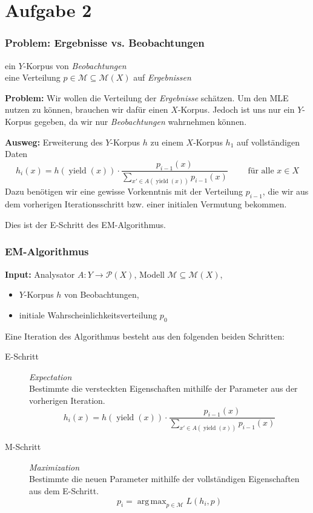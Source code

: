 \documentclass{beamer}
\DeclareMathOperator*{\argmax}{arg\,max}
\begin{document}
\section{Aufgabe 2}

\begin{frame} \frametitle{Problem: Ergebnisse vs. Beobachtungen}
	\justifying \footnotesize 
	 ein $Y$-Korpus von \textit{Beobachtungen} \\	
	 eine Verteilung $p \in \mathcal{M} \subseteq \mathcal{M}(X)$ auf \textit{Ergebnissen}
	
	\bigskip \pause
	
	\textbf{Problem:} Wir wollen die Verteilung der \textit{Ergebnisse} schätzen. Um den MLE nutzen zu können, brauchen wir dafür einen $X$-Korpus. Jedoch ist uns nur ein $Y$-Korpus gegeben, da wir nur \textit{Beobachtungen} wahrnehmen können. 
	\pause
	
	\textbf{Ausweg:} Erweiterung des $Y$-Korpus $h$ zu einem $X$-Korpus $h_1$ auf vollständigen Daten
	\begin{equation*}
		h_i(x) = h(\operatorname{yield}(x)) \cdot \frac{p_{i-1}(x)}{\sum_{x' \in A(\operatorname{yield}(x))} p_{i-1}(x)} \qquad \text{ für alle } x \in X
	\end{equation*}
	Dazu benötigen wir eine gewisse Vorkenntnis mit der Verteilung $p_{i-1}$, die wir aus dem vorherigen Iterationsschritt bzw. einer initialen Vermutung bekommen.
	
	Dies ist der E-Schritt des EM-Algorithmus.
\end{frame}

\begin{frame} \frametitle{EM-Algorithmus}
	\footnotesize
	\textbf{Input:} Analysator $A : Y \to \mathcal{P}(X)$, Modell $\mathcal{M} \subseteq \mathcal{M}(X)$, \\
	\begin{itemize}
		\item $Y$-Korpus $h$ von Beobachtungen,
		\item initiale Wahrscheinlichkeitsverteilung $p_0$ 
	\end{itemize}
	
	Eine Iteration des Algorithmus besteht aus den folgenden beiden Schritten:
	\begin{description}
		\item[E-Schritt] \textit{Expectation} \\
		Bestimmte die versteckten Eigenschaften mithilfe der Parameter aus der vorherigen Iteration.
		\begin{equation*}
		h_i(x) = h(\operatorname{yield}(x)) \cdot \frac{p_{i-1}(x)}{\sum_{x' \in A(\operatorname{yield}(x))} p_{i-1}(x)}
		\end{equation*}
		\item[M-Schritt] \textit{Maximization} \\
		Bestimmte die neuen Parameter mithilfe der vollständigen Eigenschaften aus dem E-Schritt.
		\begin{equation*}
		p_i = \argmax_{p \in \mathcal{M}} L(h_i, p)
		\end{equation*}
	\end{description}
\end{frame}
\end{document}
